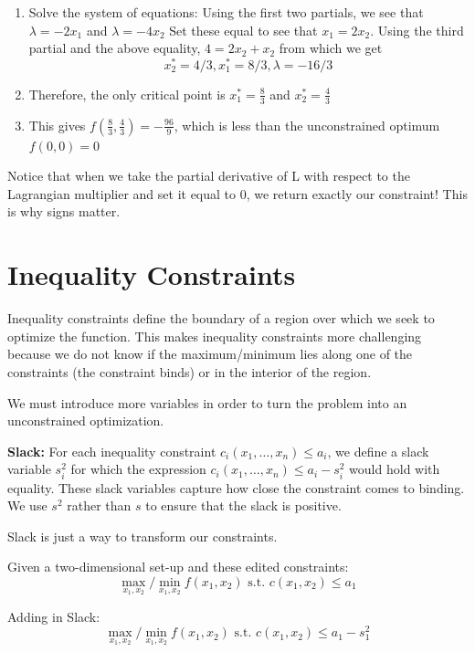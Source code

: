 \documentclass[]{book}
\theoremstyle{definition}
\theoremstyle{definition}
\theoremstyle{definition}
\theoremstyle{remark}
\begin{document}
\begin{enumerate}
\def\labelenumi{\arabic{enumi}.}
\setcounter{enumi}{2}
\item
  Solve the system of equations: Using the first two partials, we see that \(\lambda = -2x_1\) and \(\lambda = -4x_2\)
  Set these equal to see that \(x_1 = 2x_2\).
  Using the third partial and the above equality, \(4 = 2x_2 + x_2\) from which we get \[x_2^* = 4/3, x_1^* = 8/3, \lambda = -16/3\]
\item
  Therefore, the only critical point is \(x_1^* = \frac{8}{3}\) and \(x_2^* = \frac{4}{3}\)
\item
  This gives \(f(\frac{8}{3}, \frac{4}{3}) = -\frac{96}{9}\), which is less than the unconstrained optimum \(f(0,0) = 0\)
\end{enumerate}

Notice that when we take the partial derivative of L with respect to the Lagrangian multiplier and set it equal to 0, we return exactly our constraint! This is why signs matter.

\hypertarget{inequality-constraints}{%
\section{Inequality Constraints}\label{inequality-constraints}}

Inequality constraints define the boundary of a region over which we seek to optimize the function. This makes inequality constraints more challenging because we do not know if the maximum/minimum lies along one of the constraints (the constraint binds) or in the interior of the region.

We must introduce more variables in order to turn the problem into an unconstrained optimization.

\textbf{Slack:} For each inequality constraint \(c_i(x_1, \dots, x_n) \leq a_i\), we define a slack variable \(s_i^2\) for which the expression \(c_i(x_1, \dots, x_n) \leq a_i - s_i^2\) would hold with equality. These slack variables capture how close the constraint comes to binding. We use \(s^2\) rather than \(s\) to ensure that the slack is positive.

Slack is just a way to transform our constraints.

Given a two-dimensional set-up and these edited constraints:
\[\max_{x_1,x_2}/\min_{x_1,x_2} f(x_1,x_2) \text{ s.t. } c(x_1,x_2) \le a_1\]

Adding in Slack:
\[\max_{x_1,x_2}/\min_{x_1,x_2} f(x_1,x_2) \text{ s.t. } c(x_1,x_2) \le a_1 - s_1^2\]
\end{document}
